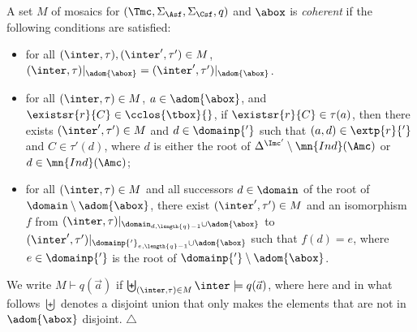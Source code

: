 \documentclass{lmcs}
\theoremstyle{definition}
\begin{document}
\begin{defi}
  A set $M$ of mosaics for $(\Tmc,\Sigma_\Asf,\Sigma_\Csf,q)$ and
  $\abox$ is \emph{coherent} if the following conditions are
  satisfied:
  \begin{itemize}
  \item for all $(\inter,\tau),(\inter',\tau')\in M$,
$(\inter,\tau)|_{\adom{\abox}}=(\inter',\tau')|_{\adom{\abox}}$.
\item for all $(\inter,\tau)\in M$, $a\in\adom{\abox}$, and
  $\existsr{r}{C}\in\cclos{\tbox}{}$, if $\existsr{r}{C}\in\tau(a)$,
  then there exists $(\inter',\tau')\in M$ and $d\in\domainp{'}$ such
  that $(a,d)\in\extp{r}{'}$ and $C\in\tau'(d)$, where $d$ is either
  the root of $\Delta^{\Imc'}\setminus \mn{Ind}(\Amc)$ or $d\in
  \mn{Ind}(\Amc)$;
\item for all $(\inter,\tau)\in M$ and all successors $d\in\domain$ of the root of $\domain\setminus\adom{\abox}$, 
  there exist $(\inter',\tau')\in M$ and an isomorphism $f$ from $(\inter,\tau)|_{\domain_{d,\length{q}-1}\cup\adom{\abox}}$ 
  to $(\inter',\tau')|_{\domainp{'}_{e,\length{q}-1}\cup\adom{\abox}}$ such that $f(d)=e$, where
  $e\in\domainp{'}$ is the root of $\domainp{'}\setminus\adom{\abox}$.
\end{itemize}
We write $M\vdash q(\vec{a})$ if $\biguplus_{(\inter,\tau)\in M}\inter\models
q(\vec{a})$, where here and in what follows $\biguplus$ denotes a disjoint
union that only makes the elements that are not in $\adom{\abox}$
disjoint.
  \hfill$\triangle$
\end{defi}
\end{document}

